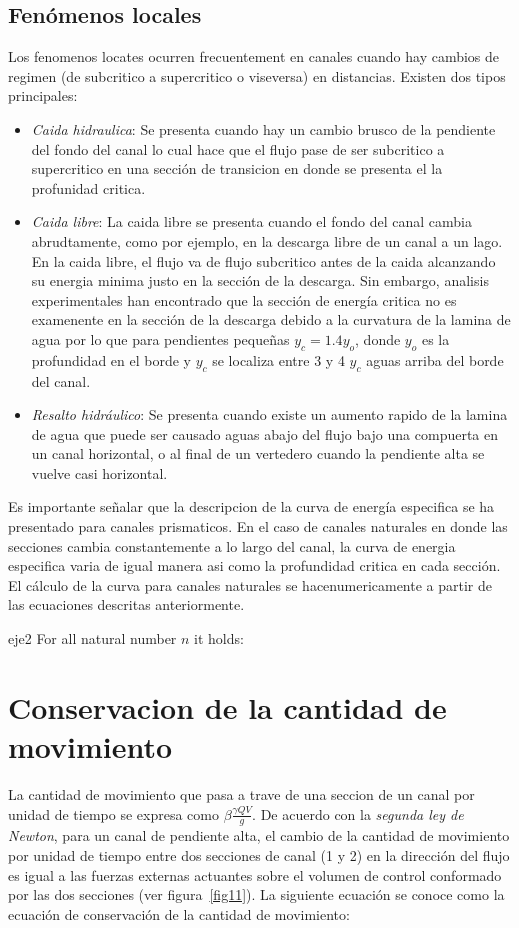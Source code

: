 \documentclass[11pt, oneside]{article}
\begin{document}
\subsection{Fen\'omenos locales}
Los fenomenos locates ocurren frecuentement en canales cuando hay cambios de regimen (de subcritico a supercritico o viseversa) en distancias. Existen dos tipos principales:
\begin{itemize}
\item \emph{Caida hidraulica}: Se presenta cuando hay un cambio brusco de la pendiente del fondo del canal lo cual hace que el flujo pase de ser subcritico a supercritico en una secci\'on de transicion en donde se presenta el la profunidad critica. 
\item \emph{Caida libre}: La caida libre se presenta cuando el fondo del canal cambia abrudtamente, como por ejemplo, en la descarga libre de un canal a un lago. En la caida libre, el flujo va de flujo subcritico antes de la caida alcanzando su energia minima justo en la secci\'on de la descarga. Sin embargo, analisis experimentales han encontrado que la secci\'on de energ\'ia critica no es examenente en la secci\'on de la descarga debido a la curvatura de la lamina de agua por lo que para pendientes pequeñas $y_c = 1.4 y_o$, donde $y_o$ es la profundidad en el borde y $y_c$ se localiza entre 3 y 4 $y_c$ aguas arriba del borde del canal.
\item \emph{Resalto hidr\'aulico}: Se presenta cuando existe un aumento rapido de la lamina de agua que puede ser causado aguas abajo del flujo bajo una compuerta  en un canal horizontal, o al final de un vertedero cuando la pendiente alta se vuelve casi horizontal. 
\end{itemize}
Es importante señalar que la descripcion de la curva de energ\'ia especifica se ha presentado para canales prismaticos. En el caso de canales naturales en donde las secciones cambia constantemente a lo largo del canal, la curva de energia especifica varia de igual manera asi como la profundidad critica en cada secci\'on. El c\'alculo de la curva para canales naturales se hacenumericamente a partir de las ecuaciones descritas anteriormente. 

\begin{eje}{}{eje2}
  For all natural number $n$ it holds:
\end{eje}

\section{Conservacion de la cantidad de movimiento}%
La cantidad de movimiento que pasa a trave de una seccion de un canal por unidad de tiempo se expresa como $\beta\frac{ \gamma Q V}{g}$. De acuerdo con la \emph{segunda ley de Newton}, para un canal de pendiente alta, el cambio de la cantidad de movimiento por unidad de tiempo entre dos secciones de canal (1 y 2) en la direcci\'on del flujo es igual a las fuerzas externas actuantes sobre el volumen de control conformado por las dos secciones (ver figura~\ref{fig11}). La siguiente ecuaci\'on se conoce como la ecuaci\'on de conservaci\'on de la cantidad de movimiento:
\end{document}
